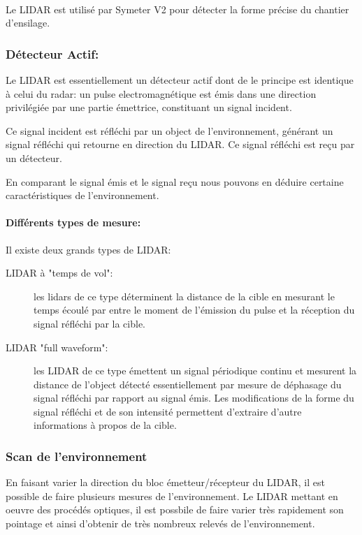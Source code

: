 \documentclass[12pt,a4paper]{report}
\begin{document}
		\paragraph*{} Le LIDAR est utilisé par Symeter V2 pour détecter la forme précise du chantier d'ensilage.
		
		\subsubsection{Détecteur Actif:}
		Le LIDAR est essentiellement un détecteur actif dont de le principe est identique à celui du radar: un pulse electromagnétique est émis dans une direction privilégiée par une partie émettrice, constituant un signal incident. 
		
		\para Ce signal incident est réfléchi par un object de l'environnement, générant un signal réfléchi qui retourne en direction du LIDAR. Ce signal réfléchi est reçu par un détecteur. 
		
		\para En comparant le signal émis et le signal reçu nous pouvons en déduire certaine caractéristiques de l'environnement.
		
		\paragraph*{Différents types de mesure: } Il existe deux grands types de LIDAR: \begin{description}
			\item[LIDAR  à "temps de vol":] les lidars de ce type déterminent la distance de la cible en mesurant le temps écoulé par entre le moment de l'émission du pulse et la réception du signal réfléchi par la cible.
			\item[LIDAR  "full waveform":] les LIDAR de ce type émettent un signal périodique continu et mesurent la distance de l'object détecté essentiellement par mesure de déphasage du signal réfléchi par rapport au signal émis. Les modifications de la forme du signal réfléchi et de son intensité permettent d'extraire d'autre informations à propos de la cible. 
		\end{description} 
		
		\subsubsection{Scan de l'environnement}
		En faisant varier la direction du bloc émetteur/récepteur du LIDAR, il est possible de faire plusieurs mesures de l'environnement. Le LIDAR mettant en oeuvre des procédés optiques, il est possbile de faire varier très rapidement son pointage et ainsi d'obtenir de très nombreux relevés de l'environnement.
		
\end{document}
